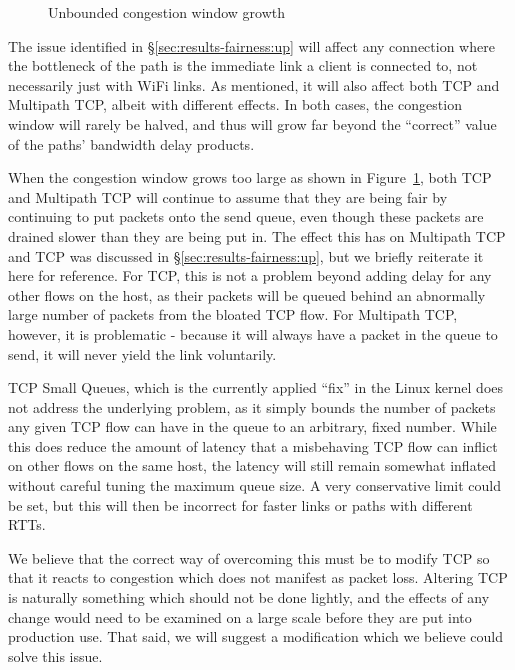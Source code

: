 \begin{figure}[h]
 \centering
 
 \caption{Unbounded congestion window growth}\label{graph:logarithmic}
\end{figure}

The issue identified in \S\ref{sec:results-fairness:up} will affect any
connection where the bottleneck of the path is the immediate link a client is
connected to, not necessarily just with WiFi links. As mentioned, it will also
affect both TCP and Multipath TCP, albeit with different effects. In both cases,
the congestion window will rarely be halved, and thus will grow far beyond the
``correct'' value of the paths' bandwidth delay products.

When the congestion window grows too large as shown in
Figure~\ref{graph:logarithmic}, both TCP and Multipath TCP will continue to
assume that they are being fair by continuing to put packets onto the send
queue, even though these packets are drained slower than they are being put in.
The effect this has on Multipath TCP and TCP was discussed in
\S\ref{sec:results-fairness:up}, but we briefly reiterate it here for reference.
For TCP, this is not a problem beyond adding delay for any other flows on the
host, as their packets will be queued behind an abnormally large number of
packets from the bloated TCP flow. For Multipath TCP, however, it is problematic
- because it will always have a packet in the queue to send, it will never yield
the link voluntarily.

TCP Small Queues, which is the currently applied ``fix'' in the Linux kernel
does not address the underlying problem, as it simply bounds the number of
packets any given TCP flow can have in the queue to an arbitrary, fixed number.
While this does reduce the amount of latency that a misbehaving TCP flow can
inflict on other flows on the same host, the latency will still remain somewhat
inflated without careful tuning the maximum queue size. A very conservative
limit could be set, but this will then be incorrect for faster links or paths
with different RTTs.

We believe that the correct way of overcoming this must be to modify TCP so that
it reacts to congestion which does not manifest as packet loss. Altering TCP is
naturally something which should not be done lightly, and the effects of any
change would need to be examined on a large scale before they are put into
production use. That said, we will suggest a modification which we believe could
solve this issue.

